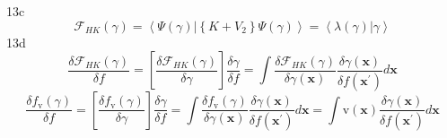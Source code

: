 \documentclass[aps,preprint]{revtex4}%
\begin{document}
13c%
\[
\mathcal{F}_{HK}\left(  \gamma\right)  =\left\langle \left.  \Psi\left(
\gamma\right)  \right\vert \left\{  K+V_{2}\right\}  \Psi\left(
\gamma\right)  \right\rangle =\left\langle \lambda\left(  \gamma\right)
\left\vert \gamma\right.  \right\rangle
\]
13d%
\[
\frac{\delta\mathcal{F}_{HK}\left(  \gamma\right)  }{\delta f}=\left[
\frac{\delta\mathcal{F}_{HK}\left(  \gamma\right)  }{\delta\gamma}\right]
\frac{\delta\gamma}{\delta f}=\int\frac{\delta\mathcal{F}_{HK}\left(
\gamma\right)  }{\delta\gamma\left(  \mathbf{x}\right)  }\frac{\delta
\gamma\left(  \mathbf{x}\right)  }{\delta f\left(  \mathbf{x}^{\prime}\right)
}d\mathbf{x}%
\]%
\[
\frac{\delta f_{\mathrm{v}}\left(  \gamma\right)  }{\delta f}=\left[
\frac{\delta f_{\mathrm{v}}\left(  \gamma\right)  }{\delta\gamma}\right]
\frac{\delta\gamma}{\delta f}=\int\frac{\delta f_{\mathrm{v}}\left(
\gamma\right)  }{\delta\gamma\left(  \mathbf{x}\right)  }\frac{\delta
\gamma\left(  \mathbf{x}\right)  }{\delta f\left(  \mathbf{x}^{\prime}\right)
}d\mathbf{x=}\int\mathrm{v}\left(  \mathbf{x}\right)  \frac{\delta
\gamma\left(  \mathbf{x}\right)  }{\delta f\left(  \mathbf{x}^{\prime}\right)
}d\mathbf{x}%
\]
\end{document}
